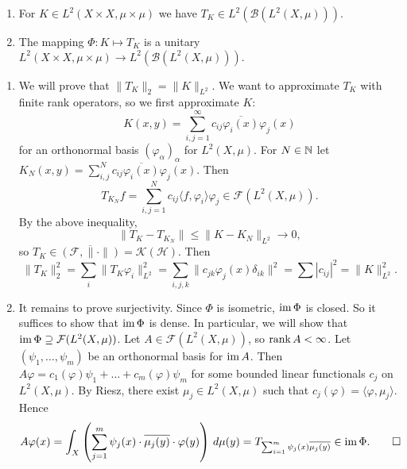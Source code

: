 \begin{theorem}
  \begin{enumerate}
    \item For $K \in L^2 (X \times X, \mu \times \mu)$ we have $T_K \in L^2 (\mathcal{B} (L^2 (X, \mu)))$.
    \item The mapping $\Phi: K \mapsto T_K$ is a unitary 
    $L^2 (X \times X, \mu \times \mu) \to L^2 (\mathcal{B} (L^2 (X, \mu))).$
  \end{enumerate}
\end{theorem}

\begin{myproof}
  \begin{enumerate}
    \item We will prove that $\| T_K\|_2 = \| K\|_{L^2}$.
    We want to approximate $T_K$ with finite rank operators, so we first approximate $K$:
    $$K (x, y) = \sum_{i, j = 1} ^\infty c_{ij} \overline{\varphi_{i} (x)} \varphi_j (x)$$
    for an orthonormal basis $(\varphi_\alpha)_{\alpha}$ for $L^2 (X, \mu)$.
    For $N \in \mathbb {N}$ let $K_{N} (x, y) = \sum_{i, j} ^N c_{ij} \overline{\varphi_i (x)} \varphi_j (x)$.
    Then 
    $$T_{K_N} f = \sum_{i, j = 1} ^N c_{ij} \langle f, \varphi_i\rangle \varphi_j \in \mathcal{F} (L^2 (X, \mu)).$$
    By the above inequality, 
    $$\| T_K - T_{K_N}\| \leq \| K - K_N\|_{L^2} \to 0,$$
    so $T_K \in \overline{(\mathcal{F}, \| \cdot\|)} = \mathcal{K} (\mathcal{H})$.
    Then $$\| T_K \|^2 _2 = \sum_i \| T_K \varphi_i \|_{L^2} ^2 = \sum_{i, j, k} \| c_{jk} \varphi_j (x) \delta_{ik} \|^2 = \sum |c_{ij}|^2 = \|K \|_{L^2} ^2.$$
    \item It remains to prove surjectivity. Since $\Phi$ is isometric, $\operatorname{im} \Phi$ is closed.
    So it suffices to show that $\operatorname{im} \Phi$ is dense. In particular, we will show that $\operatorname{im} \Phi \supseteq \mathcal{F} (L^2 (X, \mu))$.
    Let $A \in \mathcal{F} (L^2 (X, \mu))$, so $\operatorname{rank} A < \infty$. Let $(\psi_1, \dots, \psi_m)$ be an orthonormal basis for $\operatorname{im} A$.
    Then $A \varphi = c_1 (\varphi) \psi_1 + \dots + c_m (\varphi) \psi_m$ for some bounded linear functionals $c_j$ on $L^2 (X, \mu)$.
    By Riesz, there exist $\mu_j \in L^2 (X, \mu)$ such that $c_j (\varphi) = \langle \varphi, \mu_j \rangle$.
    Hence \begin{equation*}
      A \varphi(x) = \int_X \left(\sum_{j = 1} ^m \psi_j (x) \cdot \overline{\mu_j (y)} \cdot \varphi (y)\right)\, d\mu (y) = T_{\sum_{i = 1} ^m \psi_j (x) \overline{\mu_j (y)}} \in \operatorname{im} \Phi. \qedhere 
    \end{equation*}
  \end{enumerate}
\end{myproof}

